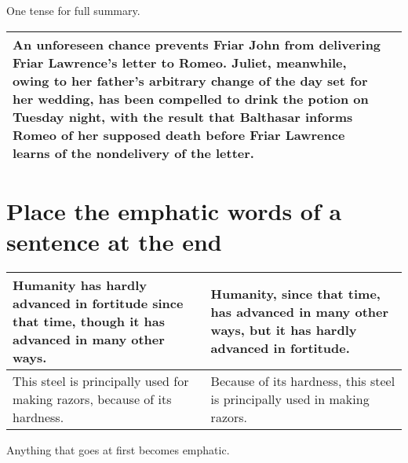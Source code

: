 \documentclass[10pt]{report}
\begin{document}
 
One tense for full summary.

	\begin{table}[!tbh]
    \centering
        \begin{tabular}{|m{18em}|m{18em}|}
        \hline
        
        An unforeseen chance prevents Friar John from delivering
Friar Lawrence’s letter to Romeo. Juliet, meanwhile,
owing to her father’s arbitrary change of the day set for
her wedding, has been compelled to drink the potion
on Tuesday night, with the result that Balthasar informs
Romeo of her supposed death before Friar Lawrence
learns of the nondelivery of the letter.\\
\hline



       
        

 \end{tabular}
 \end{table}
 

 
 



 \section {\bfseries Place the emphatic words of a sentence at the end}
 
 \begin{table}[!tbh]
    \centering
        \begin{tabular}{|m{18em}|m{18em}|}
        \hline
        Humanity has hardly advanced
in fortitude since that time,
though it has advanced in many
other ways.&
Humanity, since that time, has
advanced in many other ways,
but it has hardly advanced
in fortitude.\\
\hline
This steel is principally used
for making razors, because of
its hardness.&
Because of its hardness, this
steel is principally used in making
razors.\\
\hline
 \end{tabular}
 \end{table}
 
 



 
Anything that goes at first becomes emphatic.

\

 

 


\newpage

~

\newpage
\end{document}
